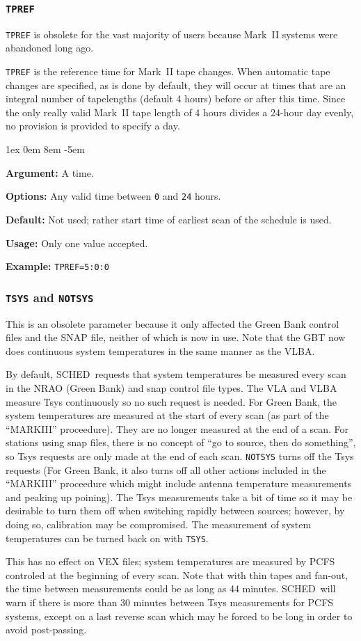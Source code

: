 \documentclass{report}
\newcommand{\schedb}{{\sc SCHED~}}
\newcommand{\rcwbox}[5]{
  \begin{list}{}{\parsep 1ex  \itemsep 0em
                 \leftmargin 8em  \itemindent -5em }
    \item {\bf Argument:} #1
    \item {\bf Options:}  #2
    \item {\bf Default:}  #3
    \item {\bf Usage:}    #4
    \item {\bf Example:}  #5
  \end{list}
}
\begin{document}
\subsubsection{\label{MP:TPREF}{\tt TPREF}}

{\tt TPREF} is obsolete for the vast majority of users because Mark~II
systems were abandoned long ago.

{\tt TPREF} is the reference time for Mark~II tape changes. When
automatic tape changes are specified, as is done by default, they will
occur at times that are an integral number of tapelengths (default 4
hours) before or after this time.  Since the only really valid Mark~II
tape length of 4 hours divides a 24-hour day evenly, no provision is
provided to specify a day.

\rcwbox
{A time.}
{Any valid time between {\tt 0} and {\tt 24} hours.}
{Not used; rather start time of earliest scan of the schedule is used.}
{Only one value accepted.}
{{\tt TPREF=5:0:0}}


\subsubsection{\label{MP:TSYS}{\tt TSYS} and {\tt NOTSYS}}

This is an obsolete parameter because it only affected the Green Bank
control files and the SNAP file, neither of which is now in use.  Note
that the GBT now does continuous system temperatures in the same manner
as the VLBA.

By default, \schedb requests that system temperatures be measured
every scan in the NRAO (Green Bank) and snap control file types. The
VLA and VLBA measure Tsys continuously so no such request is
needed. For Green Bank, the system temperatures are measured at the
start of every scan (as part of the ``MARKIII'' proceedure).  They are
no longer measured at the end of a scan.  For stations using snap
files, there is no concept of ``go to source, then do something'', so
Tsys requests are only made at the end of each scan. {\tt NOTSYS}
turns off the Tsys requests (For Green Bank, it also turns off all
other actions included in the ``MARKIII'' proceedure which might
include antenna temperature measurements and peaking up poining). The
Tsys measurements take a bit of time so it may be desirable to turn
them off when switching rapidly between sources; however, by doing so,
calibration may be compromised.  The measurement of system
temperatures can be turned back on with {\tt TSYS}.

This has no effect on VEX files; system temperatures are measured by
PCFS controled at the beginning of every scan. Note that with thin
tapes and fan-out, the time between measurements could be as long as 44
minutes. \schedb will warn if there is more than 30 minutes between
Tsys measurements for PCFS systems, except on a last reverse scan which
may be forced to be long in order to avoid post-passing.
\end{document}
